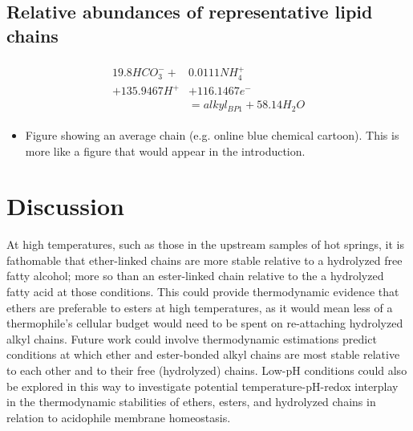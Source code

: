



\subsection{Relative abundances of representative lipid chains} 


\begin{align}
\begin{split}
    19.8HCO_{3}^{-} + &0.0111NH_{4}^{+}\\
    + 135.9467H^{+} &+ 116.1467e^{-}\\
    &= alkyl_{BP1} + 58.14H_{2}O
\end{split}
\end{align}

\begin{itemize}

    \item Figure showing an average chain (e.g. online blue chemical cartoon). This is more like a figure that would appear in the introduction.
    
\end{itemize}


\section{Discussion}


At high temperatures, such as those in the upstream samples of hot springs, it is fathomable that ether-linked chains are more stable relative to a hydrolyzed free fatty alcohol; more so than an ester-linked chain relative to the a hydrolyzed fatty acid at those conditions. This could provide thermodynamic evidence that ethers are preferable to esters at high temperatures, as it would mean less of a thermophile's cellular budget would need to be spent on re-attaching hydrolyzed alkyl chains. Future work could involve thermodynamic estimations predict conditions at which ether and ester-bonded alkyl chains are most stable relative to each other and to their free (hydrolyzed) chains. Low-pH conditions could also be explored in this way to investigate potential temperature-pH-redox interplay in the thermodynamic stabilities of ethers, esters, and hydrolyzed chains in relation to acidophile membrane homeostasis.



